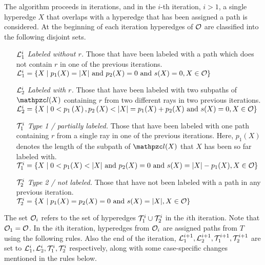  \xnoindent The algorithm proceeds in iterations, and in the $i$-th
 iteration, $i > 1$, a single hyperedge $X$ that overlaps with a
 hyperedge that has been assigned a path is considered.  At the
 beginning of each iteration hyperedges of ${\cal O}$ are classified into
 the following disjoint sets.
 \begin{enumerate}
 \item [${\cal L}_1^i$] {\em Labeled without $r$.} Those that have been
   labeled with a path which does not contain $r$ in one of the
   previous iterations.\\  ${\cal L}_1^i = \left\{  X \mid p_1(X) = |X| \text{ and
     } p_2(X) = 0 \text{ and } s(X) = 0, X \in {\cal O}\right\}$
 \item [${\cal L}_2^i$] {\em Labeled with $r$.} Those that have been labeled
   with two subpaths of $\cl(X)$ containing $r$ from two different rays
   in two previous iterations.\\ ${\cal L}_2^i = \left\{ X \mid 0 < p_1\left(X\right),
     p_2\left(X\right) < |X|=p_1(X)+p_2(X) \text{ and } s(X) = 0, X \in {\cal O}\right\}$
   \item [${\cal T}_1^i$] {\em Type 1 / partially labeled.} Those that have
     been labeled with one path containing $r$ from a single ray in one
     of the previous iterations. Here, $p_1(X)$ denotes the length of
     the subpath of $\cl(X)$ that $X$ has been so far labeled
     with. \\
     ${\cal T}_1^i = \left\{  X \mid 0 < p_1(X) < |X| \text{ and } p_2(X) = 0
       \text{ and } s(X) = |X|-p_1(X), X \in {\cal O}\right\}$
   \item [${\cal T}_2^i$] {\em Type 2 / not labeled.} Those that have not been
     labeled with a path in any previous iteration.\\
     ${\cal T}_2^i = \left\{  X \mid p_1(X) = p_2(X) = 0 \text{ and } s(X) = |X|,
       X \in {\cal O}\right\}$
 \end{enumerate}

\noindent
The set ${\cal O}_i$ refers to the set of hyperedges ${\cal T}_1^i \cup {\cal T}_2^i$
in the $i$th iteration.  Note that ${\cal O}_1 = {\cal O}$.  In the $i$th
iteration, hyperedges from ${\cal O}_i$ are assigned paths from $T$ using
the following rules. Also the end of the iteration, ${\cal L}_1^{i+1},
{\cal L}_2^{i+1}, {\cal T}_1^{i+1}, {\cal T}_2^{i+1}$ are set to ${\cal L}_1^{i},
{\cal L}_2^{i}, {\cal T}_1^{i}, {\cal T}_2^{i}$ respectively, along with some
case-specific changes mentioned in the rules below.

